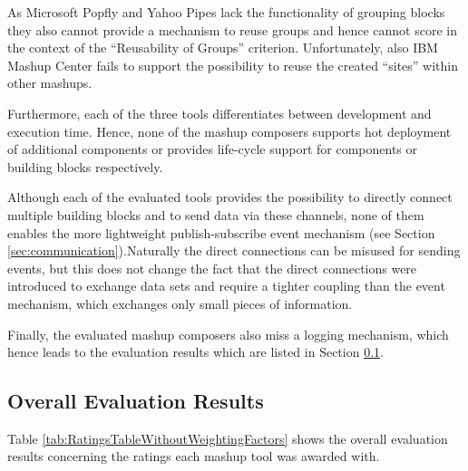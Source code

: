 As Microsoft Popfly and Yahoo Pipes lack the functionality of grouping blocks they also cannot
provide a mechanism to reuse groups and hence cannot score in the context of the ``Reusability of
Groups'' criterion. Unfortunately, also IBM Mashup Center fails to support the possibility to reuse
the created ``sites'' within other mashups.

Furthermore, each of the three tools differentiates between development and execution time. Hence,
none of the mashup composers supports hot deployment of additional components or provides life-cycle
support for components or building blocks respectively.

Although each of the evaluated tools provides the possibility to directly connect multiple building
blocks and to send data via these channels, none of them enables the more lightweight
publish-subscribe event mechanism (see Section \ref{sec:communication}).\newline Naturally the
direct connections can be misused for sending events, but this does not change the fact that the direct connections were introduced to
exchange data sets and require a tighter coupling than the event mechanism, which exchanges only
small pieces of information.

Finally, the evaluated mashup composers also miss a logging mechanism, which hence leads to the
evaluation results which are listed in Section \ref{sec:overall_evaluation_results}.

\subsection{Overall Evaluation Results}
\label{sec:overall_evaluation_results}

Table \ref{tab:RatingsTableWithoutWeightingFactors} shows the overall evaluation results concerning
the ratings each mashup tool was awarded with.

